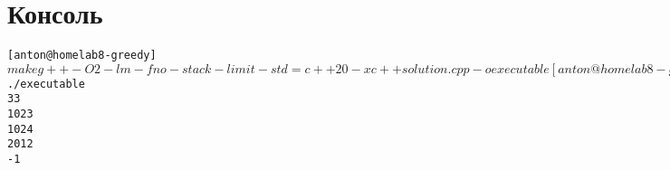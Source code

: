\pagebreak

\section{Консоль}
\begin{alltt}
	[anton@home lab8-greedy]$ make
	g++ -O2 -lm -fno-stack-limit -std=c++20 -x c++ solution.cpp -o executable
	[anton@home lab8-greedy]$ ./executable 
	3 3
	1 0 2 3
	1 0 2 4
	2 0 1 2
	-1
	
\end{alltt}
\pagebreak